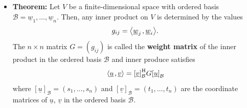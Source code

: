 \documentclass[11pt,twoside]{report}
\newcommand{\bbR}{{\mathbb{R}}}
\newcommand{\vecnot}{\underline}
\newcommand{\Herm}{{\mathrm{H}}}
\newcommand{\Span}{\mathrm{span}}
\newcommand{\inner}[2]{{\left\langle #1 \mskip2mu , #2 \right\rangle}}
\begin{document}
\begin{itemize}
\begin{itemize}
\item {} [Standard Inner Product on a Function Space]
Let $V$ be the vector space of all continuous complex-valued functions on the unit interval $[0,1]$.
Then, the following defines an inner product 
\begin{equation*}
\inner{ f }{ g } = \int_0^1 f(t) \overline{g(t)} \, dt
\end{equation*}


\item{} [Inner Product on Space of Random Variables]
Let $W$ be a set of real-valued random variables with finite 2nd moments.
Then, $V = \Span (W)$ is a vector space over $\bbR$ with inner product 
\[ \inner{ X }{ Y } =\ex{ XY} \]
\end{itemize}

\item \textbf{Theorem:} 
Let $V$ be a finite-dimensional space with ordered basis $\mathcal{B} = \vecnot{w}_1, \ldots, \vecnot{w}_n$.
Then, any inner product on $V$ is determined by the values
\begin{equation*}
g_{ij} = \inner{ \vecnot{w}_j }{ \vecnot{w}_i }.
\end{equation*}
The $n \times n$ matrix $G = (g_{ij})$ is called the \textbf{weight matrix} of the inner product in the ordered basis $\mathcal{B}$ and inner produce satisfies 
\[
\inner{ \vecnot{u} }{ \vecnot{v} } =  \left[ \vecnot{v} \right]_{\mathcal{B}}^\Herm G \left[ \vecnot{u} \right]_{\mathcal{B}}
\]
where $\left[ \vecnot{u} \right]_{\mathcal{B}} = (s_1,\ldots,s_n)$ and $\left[ \vecnot{v} \right]_{\mathcal{B}} = (t_1,\ldots,t_n)$ are the coordinate matrices of $\vecnot{u}$, $\vecnot{v}$ in the ordered basis $\mathcal{B}$.


\end{itemize}
\end{document}
